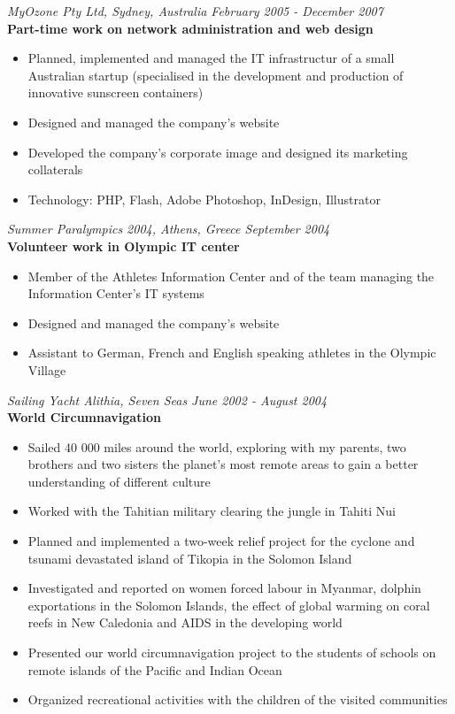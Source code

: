 \documentclass[margin]{res}
\begin{document}
\begin{resume}
\begin{itemize}
  \end{itemize}
  {\it MyOzone Pty Ltd, Sydney, Australia \hfill February 2005 - December 2007} \\
  {\bf Part-time work on network administration and web design}
  \begin{itemize} \itemsep -0.5pt
  \item Planned, implemented and managed the IT infrastructur of a small Australian startup (specialised in the development and production of innovative sunscreen containers)
  \item Designed and managed the company’s website
  \item Developed the company’s corporate image and designed its marketing collaterals
  \item Technology: PHP, Flash, Adobe Photoshop, InDesign, Illustrator
  \end{itemize}
  {\it Summer Paralympics 2004, Athens, Greece \hfill September 2004} \\
  {\bf Volunteer work in Olympic IT center}
  \begin{itemize} \itemsep -0.5pt
  \item Member of the Athletes Information Center and of the team managing the Information Center’s IT systems
  \item Designed and managed the company’s website
  \item Assistant to German, French and English speaking athletes in the Olympic Village
  \end{itemize}
  {\it Sailing Yacht Alithia, Seven Seas \hfill June 2002 - August 2004} \\
  {\bf World Circumnavigation}
  \begin{itemize} \itemsep -0.5pt
  \item Sailed 40 000 miles around the world, exploring with my parents, two brothers and two sisters the planet’s most remote areas to gain a better understanding of different culture
  \item Worked with the Tahitian military clearing the jungle in Tahiti Nui
  \item Planned and implemented a two-week relief project for the cyclone and tsunami devastated island of Tikopia in the Solomon Island
  \item Investigated and reported on women forced labour in Myanmar, dolphin exportations in the Solomon Islands, the effect of global warming on coral reefs in New Caledonia and AIDS in the developing world
  \item Presented our world circumnavigation project to the students of schools on remote islands of the Pacific and Indian Ocean
  \item Organized recreational activities with the children of the visited communities
  \end{itemize}


\end{resume}
\end{document}
